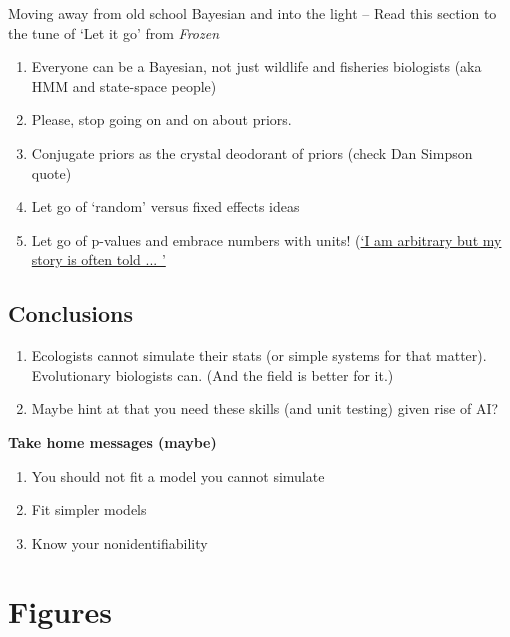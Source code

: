 \documentclass[11pt]{article}
\begin{document}
Moving away from old school Bayesian and into the light -- Read this section to the tune of `Let it go' from \emph{Frozen} 
\begin{enumerate}
\item Everyone can be a Bayesian, not just wildlife and fisheries biologists (aka HMM and state-space people)
\item Please, stop going on and on about priors. 
\item Conjugate priors as the crystal deodorant of priors (check Dan Simpson quote)
\item Let go of `random' versus fixed effects ideas
\item Let go of p-values and embrace numbers with units! (\href{https://www.youtube.com/watch?v=c3hxhv0lpI0}{`I am arbitrary but my story is often told ... '}
\end{enumerate}

\subsection{Conclusions}
\begin{enumerate}
\item Ecologists cannot simulate their stats (or simple systems for that matter). Evolutionary biologists can. (And the field is better for it.)
\item Maybe hint at that you need these skills (and unit testing) given rise of AI?
\end{enumerate}

{\bf Take home messages (maybe)}
\begin{enumerate}
\item You should not fit a model you cannot simulate
\item Fit simpler models
\item Know your nonidentifiability
\end{enumerate}

\section{Figures}
\end{document}
